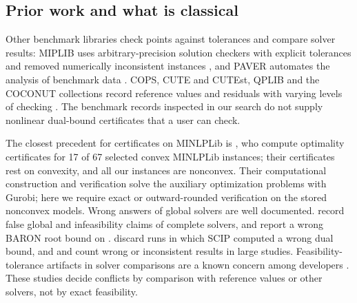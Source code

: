 \subsection{Prior work and what is classical}\label{sec:intro-prior}

Other benchmark libraries check points against tolerances and compare solver results: MIPLIB uses arbitrary-precision solution checkers with explicit tolerances and removed numerically inconsistent instances \citep{koch2011-miplib-2010-mixed-integer-programming,gleixner2021-miplib-2017-data-driven-compilation}, and PAVER automates the analysis of benchmark data \citep{bussieck2014-paver-2-0-an-open}.
COPS, CUTE and CUTEst, QPLIB and the COCONUT collections record reference values and residuals with varying levels of checking \citep{dolan2004-benchmarking-optimization-software-with-cops-2,bongartz1995-cute-constrained-and-unconstrained-testing,gould2015-cutest-a-constrained-and-unconstrained,furini2018-qplib-a-library-of-quadratic,shcherbina2003-benchmarking-global-optimization-and-constraint}.
The benchmark records inspected in our search do not supply nonlinear dual-bound certificates that a user can check.

The closest precedent for certificates on MINLPLib is \citet{halbig2024-computing-optimality-certificates-for-convex}, who compute optimality certificates for 17 of 67 selected convex MINLPLib instances; their certificates rest on convexity, and all our instances are nonconvex.
Their computational construction and verification solve the auxiliary optimization problems with Gurobi; here we require exact or outward-rounded verification on the stored nonconvex models.
Wrong answers of global solvers are well documented.
\citet{neumaier2005-a-comparison-of-complete-global} record false global and infeasibility claims of complete solvers, and \citet{nowak2008-lago-a-heuristic-branch-and} report a wrong BARON root bound on .
\citet{vigerske2017-scip-global-optimization-of-mixed} discard runs in which SCIP computed a wrong dual bound, and \citet{montanher2018-a-computational-study-of-global} and \citet{bestuzheva2025-global-optimization-of-mixed-integer} count wrong or inconsistent results in large studies.
Feasibility-tolerance artifacts in solver comparisons are a known concern among developers \citep[Berthold's contribution, \S3.6]{bonami2018-designing-and-implementing-algorithms-for}.
These studies decide conflicts by comparison with reference values or other solvers, not by exact feasibility.

